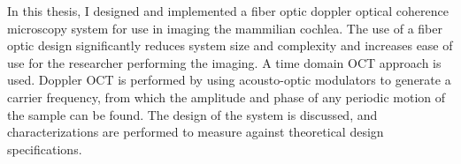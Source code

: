 % 
% 
%

In this thesis, I designed and implemented a fiber optic doppler optical coherence microscopy system for use in imaging the mammilian cochlea. The use of a fiber optic design significantly reduces system size and complexity and increases ease of use for the researcher performing the imaging. A time domain OCT approach is used. Doppler OCT is performed by using acousto-optic modulators to generate a carrier frequency, from which the amplitude and phase of any periodic motion of the sample can be found. The design of the system is discussed, and characterizations are performed to measure against theoretical design specifications.

